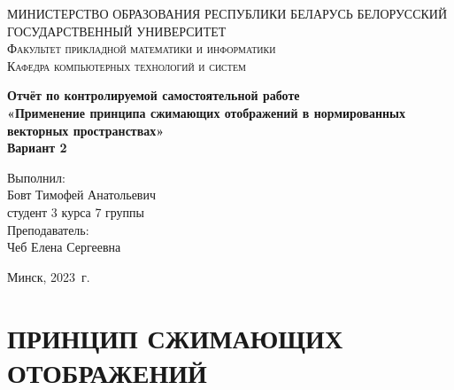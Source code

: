 \documentclass[a4paper, 12pt]{report}
\begin{document}
\renewcommand{\chaptername}{Контрольная самостоятельная работа}
\def\contentsname{Содержание}
	
	\begin{titlepage}
		\begin{center}
			\textsc{МИНИСТЕРСТВО ОБРАЗОВАНИЯ РЕСПУБЛИКИ БЕЛАРУСЬ БЕЛОРУССКИЙ ГОСУДАРСТВЕННЫЙ УНИВЕРСИТЕТ
				\\[5mm]
				Факультет прикладной математики и информатики\\[2mm]
				Кафедра компьютерных технологий и систем
				}
			
			\vfill
			
			\textbf{Отчёт по контролируемой самостоятельной работе
				\\[3mm]
				«Применение принципа сжимающих отображений в нормированных векторных пространствах»\\[6mm]
				Вариант 2
				\\[20mm]
			}
		\end{center}
		
		\hfill
		\begin{minipage}{.4\textwidth}
			Выполнил:\\[2mm] 
			Бовт Тимофей Анатольевич\\
			 студент 3 курса 7 группы\\[5mm]
			
			Преподаватель:\\[2mm] 
			Чеб Елена Сергеевна
		\end{minipage}%
		\vfill
		\begin{center}
			Минск, 2023\ г.
		\end{center}
	\end{titlepage}
	
	\newpage
	\chapter*{ПРИНЦИП СЖИМАЮЩИХ ОТОБРАЖЕНИЙ}
\end{document}
